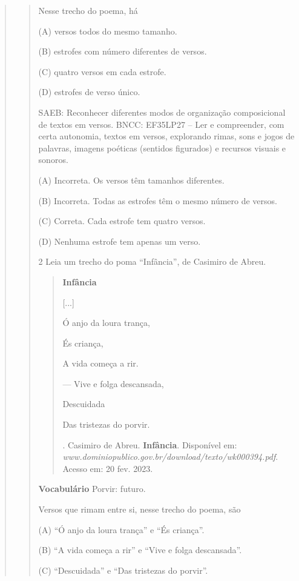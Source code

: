 \begin{boxlist}
{{\begin{quote}
\begin{quote}
\begin{quote}
\end{quote}

Nesse trecho do poema, há

(A) versos todos do mesmo tamanho.

(B) estrofes com número diferentes de versos.

(C) quatro versos em cada estrofe.

(D) estrofes de verso único.

SAEB: Reconhecer diferentes modos de organização composicional de textos em versos.
BNCC: EF35LP27 -- Ler e compreender, com certa autonomia, textos em
versos, explorando rimas, sons e jogos de palavras, imagens poéticas
(sentidos figurados) e recursos visuais e sonoros.

(A) Incorreta. Os versos têm tamanhos diferentes.

(B) Incorreta. Todas as estrofes têm o mesmo número de versos.

(C) Correta. Cada estrofe tem quatro versos.

(D) Nenhuma estrofe tem apenas um verso.

\num{2} Leia um trecho do poma ``Infância'', de Casimiro de Abreu.

\begin{quote}
\textbf{Infância}

{[}...{]}

Ó anjo da loura trança,

És criança,

A vida começa a rir.

--- Vive e folga descansada,

Descuidada

Das tristezas do porvir.

\fonte. Casimiro de Abreu. \textbf{Infância}. Disponível em:
\emph{www.dominiopublico.gov.br/download/texto/wk000394.pdf}. Acesso em: 20
fev. 2023.
\end{quote}

\textbf{Vocabulário}
Porvir: futuro.

Versos que rimam entre si, nesse trecho do poema, são

(A) ``Ó anjo da loura trança'' e ``És criança''.

(B) ``A vida começa a rir'' e ``Vive e folga descansada''.

(C) ``Descuidada'' e ``Das tristezas do porvir''.


\end{quote}
\end{quote}}}
\end{boxlist}
